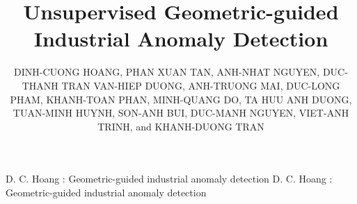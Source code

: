 \documentclass{ieeeaccess}
\begin{document}

\title{Unsupervised Geometric-guided Industrial Anomaly Detection}

\author{\uppercase{Dinh-Cuong Hoang},
\uppercase{Phan Xuan Tan},
\uppercase{Anh-Nhat Nguyen},
\uppercase{Duc-Thanh Tran}
\uppercase{Van-Hiep Duong},
\uppercase{Anh-Truong Mai},
\uppercase{Duc-Long Pham},
\uppercase{Khanh-Toan Phan},
\uppercase{Minh-Quang Do},
\uppercase{Ta Huu Anh Duong},
\uppercase{Tuan-Minh Huynh},
\uppercase{Son-Anh Bui},
\uppercase{Duc-Manh Nguyen},
\uppercase{Viet-Anh Trinh}, and
\uppercase{Khanh-Duong Tran}}


\address[1]{Greenwich Vietnam, FPT University, Hanoi, 10000, Vietnam}
\address[2]{College of Engineering, Shibaura Institute of Technology, Tokyo 135-8548, Japan}
\address[3]{IT Department, FPT University, Hanoi, 10000, Vietnam}


\markboth
{D. C. Hoang \headeretal: Geometric-guided industrial anomaly detection}
{D. C. Hoang \headeretal: Geometric-guided industrial anomaly detection}

\end{document}

